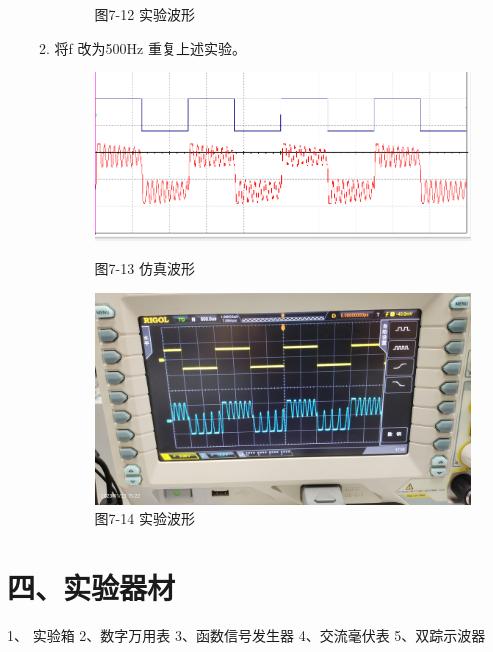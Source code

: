 \documentclass[a4paper,10pt,notitlepage]{article}
\begin{document}
\begin{enumerate}
\begin{enumerate}
\begin{figure}[h]
\begin{minipage}{0.3\textwidth}
					\caption*{图7-12 实验波形}
				\end{minipage}
			\end{figure}
			
			\item 将f 改为500Hz 重复上述实验。
			\begin{figure}[h]
				\centering
				\begin{minipage}{0.3\textwidth}
					\centering
					\includegraphics[width=\textwidth]{8.png}
					\caption*{图7-13 仿真波形}
				\end{minipage}
				\qquad
				\begin{minipage}{0.3\textwidth}
					\centering
					\includegraphics[width=\textwidth]{6.jpg}
					\caption*{图7-14 实验波形}
				\end{minipage}
			\end{figure}
		\end{enumerate}
	\end{enumerate}
	\section*{四、实验器材}
	1、 实验箱 2、数字万用表 3、函数信号发生器 4、交流毫伏表
	5、双踪示波器
\end{document}
